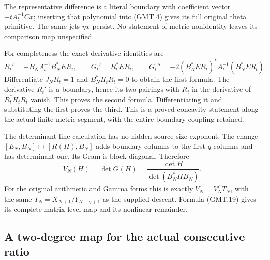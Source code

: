 The representative difference is a literal boundary with coefficient
vector $-tA_t^{-1}Cx$; inserting that polynomial into (GMT.4) gives
its full original theta primitive. The same jets $\eta x$ persist.
No statement of metric nonidentity leaves its comparison map unspecified.

For completeness the exact derivative identities are
\[
 R_t'=-B_NA_t^{-1}B_N^*ER_t,\qquad
 G_t'=R_t^*ER_t,\qquad
 G_t''=-2(B_N^*ER_t)^*A_t^{-1}(B_N^*ER_t).                     \tag{GMT.20}
\]
Differentiate $J_NR_t=1$ and $B_N^*H_tR_t=0$ to obtain the first
formula. The derivative $R_t'$ is a boundary, hence its two pairings
with $R_t$ in the derivative of $R_t^*H_tR_t$ vanish. This proves
the second formula. Differentiating it and substituting the first
proves the third. This is a proved concavity statement along the
actual finite metric segment, with the entire boundary coupling retained.

The determinant-line calculation has no hidden source-size exponent.
The change $[E_N,B_N]\mapsto[R(H),B_N]$ adds boundary columns to
the first $q$ columns and has determinant one. Its Gram is block
diagonal. Therefore
\[
 V_N(H)=\det G(H)=\frac{\det H}{\det(B_N^*HB_N)}.               \tag{GMT.21}
\]
For the original arithmetic and Gamma forms this is exactly
$V_N=V_N^\Gamma T_N$, with the same $T_N=X_{N+1}/Y_{N-q+1}$
as the supplied descent. Formula (GMT.19) gives its complete
matrix-level map and its nonlinear remainder.

\subsection{A two-degree map for the actual consecutive ratio}

